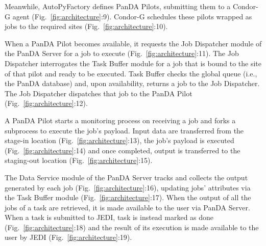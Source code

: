 Meanwhile, AutoPyFactory defines PanDA Pilots, submitting them to a Condor-G
agent (Fig.~\ref{fig:architecture}:9). Condor-G schedules these pilots
wrapped as jobs to the required sites
(Fig.~\ref{fig:architecture}:10).

When a PanDA Pilot becomes available, it requests the Job Dispatcher module
of the PanDA Server for a job to execute (Fig.~\ref{fig:architecture}:11).
The Job Dispatcher interrogates the Task Buffer module for a job that is
bound to the site of that pilot and ready to be executed. Task Buffer checks
the global queue (i.e., the PanDA database) and, upon availability, returns a
job to the Job Dispatcher. The Job Dispatcher dispatches that job to the
PanDA Pilot (Fig.~\ref{fig:architecture}:12).

A PanDA Pilot starts a monitoring process on receiving a job and forks a
subprocess to execute the job's payload. Input data are transferred
from the stage-in location (Fig.~\ref{fig:architecture}:13), the job's
payload is executed (Fig.~\ref{fig:architecture}:14) and once completed, output
is transferred to the staging-out location (Fig.~\ref{fig:architecture}:15).

The Data Service module of the PanDA Server tracks and collects the output
generated by each job (Fig.~\ref{fig:architecture}:16), updating jobs'
attributes via the Task Buffer module (Fig.~\ref{fig:architecture}:17). When
the output of all the jobs of a task are retrieved, it is made available to
the user via PanDA Server. When a task is submitted to JEDI, task is instead
marked as done (Fig.~\ref{fig:architecture}:18) and the result of its
execution is made available to the user by JEDI
(Fig.~\ref{fig:architecture}:19).

